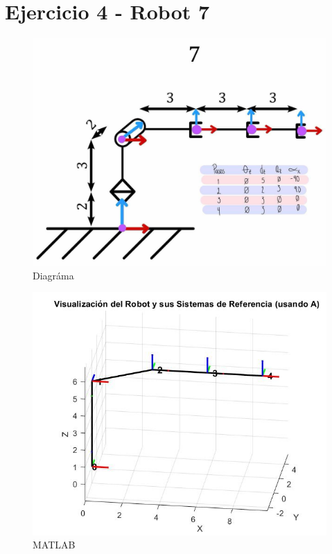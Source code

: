 \newpage
\section{Ejercicio 4 - Robot 7}

\begin{figure}[h]
	\centering
	\includegraphics[width=0.6\linewidth]{../img/ejercicio_7-dibujo}
	\caption{Diagráma}
	\label{fig:ejercicio7-dibujo}
\end{figure}

\begin{figure}[h]
	\centering
	\includegraphics[width=0.6\linewidth]{../img/ejercicio_7-matlab}
	\caption{ MATLAB}
	\label{fig:ejercicio7-matlab}
\end{figure}
